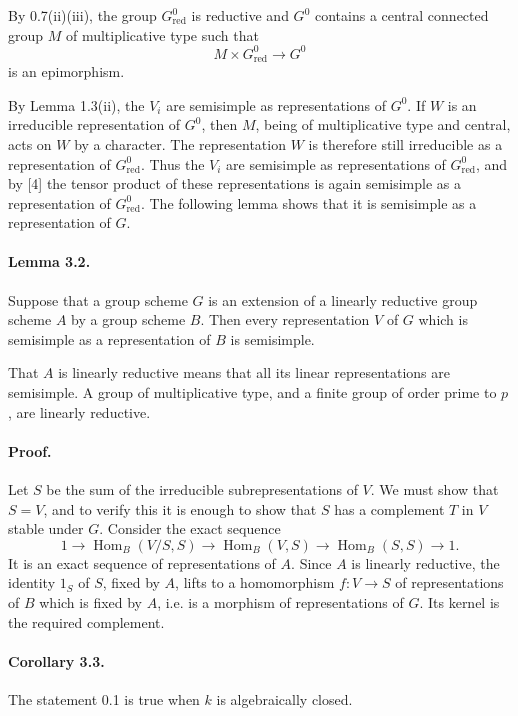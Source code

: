 \documentclass[11pt]{article}
\newcommand{\Hom}{\operatorname{Hom}}
\newcommand{\red}{\mathrm{red}}
\theoremstyle{plain}
\theoremstyle{definition}
\begin{document}
By 0.7(ii)(iii), the group $G^0_{\red}$ is reductive and $G^0$ contains a central connected group $M$ of multiplicative type such that
\[
   M\times G^0_{\red}\longrightarrow G^0
\]
is an epimorphism.

By Lemma 1.3(ii), the $V_i$ are semisimple as representations of $G^0$. If $W$ is an irreducible representation of $G^0$, then $M$, being of multiplicative type and central, acts on $W$ by a character. The representation $W$ is therefore still irreducible as a representation of $G^0_{\red}$. Thus the $V_i$ are semisimple as representations of $G^0_{\red}$, and by [4] the tensor product of these representations is again semisimple as a representation of $G^0_{\red}$. The following lemma shows that it is semisimple as a representation of $G$.

\paragraph{Lemma 3.2.} Suppose that a group scheme $G$ is an extension of a linearly reductive group scheme $A$ by a group scheme $B$. Then every representation $V$ of $G$ which is semisimple as a representation of $B$ is semisimple.

That $A$ is linearly reductive means that all its linear representations are semisimple. A group of multiplicative type, and a finite group of order prime to $p$, are linearly reductive.

\paragraph{Proof.} Let $S$ be the sum of the irreducible subrepresentations of $V$. We must show that $S=V$, and to verify this it is enough to show that $S$ has a complement $T$ in $V$ stable under $G$. Consider the exact sequence
\[
1\longrightarrow \Hom_B(V/S,S)\longrightarrow \Hom_B(V,S)\longrightarrow \Hom_B(S,S)\longrightarrow1.
\]
It is an exact sequence of representations of $A$. Since $A$ is linearly reductive, the identity $1_S$ of $S$, fixed by $A$, lifts to a homomorphism $f:V\to S$ of representations of $B$ which is fixed by $A$, i.e. is a morphism of representations of $G$. Its kernel is the required complement.

\paragraph{Corollary 3.3.} The statement 0.1 is true when $k$ is algebraically closed.
\end{document}
